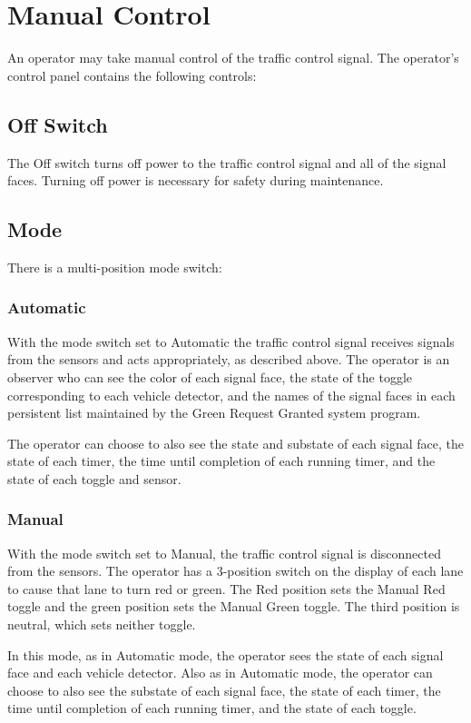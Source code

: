 \documentclass[letterpaper,twoside]{article}
\begin{document}
\section{Manual Control}

An operator may take manual control of the traffic control signal.
The operator's control panel contains the following controls:

\subsection{Off Switch}
The Off switch turns off power to the traffic control signal and all
of the signal faces.  Turning off power is necessary for safety during
maintenance.

\subsection{Mode}

There is a multi-position mode switch:

\subsubsection{Automatic}

With the mode switch set to Automatic the traffic control signal
receives signals from the sensors and acts appropriately, as described
above.  The operator is an observer who can see the color of each
signal face, the state of the toggle corresponding to each vehicle detector,
and the names of the signal faces in each persistent list maintained by
the Green Request Granted system program.

The operator can choose to also see the state and substate of each signal
face, the state of each timer, the time until completion of each
running timer, and the state of each toggle and sensor.

\subsubsection{Manual}

With the mode switch set to Manual, the traffic control signal is
disconnected from the sensors.  The operator has
a 3-position switch on the display of each lane to cause that lane to turn red
or green.  The Red position sets the Manual
Red toggle and the green position sets the Manual Green toggle.
The third position is neutral, which sets neither toggle.

In this mode, as in Automatic mode, the operator sees the state of
each signal face and each vehicle detector.  Also as in Automatic mode,
the operator can choose to also see the substate of each signal face,
the state of each timer, the time until completion of each running
timer, and the state of each toggle.
\end{document}
